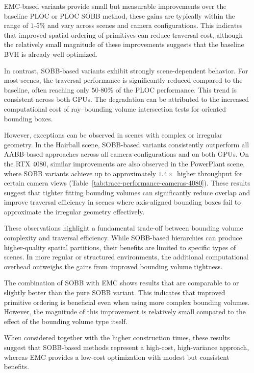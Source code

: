 EMC-based variants provide small but measurable improvements over the baseline PLOC or PLOC SOBB method, these gains are typically within the range of $1\text{-}5\%$ and vary across scenes and camera configurations. This indicates that improved spatial ordering of primitives can reduce traversal cost, although the relatively small magnitude of these improvements suggests that the baseline BVH is already well optimized.

In contrast, SOBB-based variants exhibit strongly scene-dependent behavior. For most scenes, the traversal performance is significantly reduced compared to the baseline, often reaching only $50\text{-}80\%$ of the PLOC performance. This trend is consistent across both GPUs. The degradation can be attributed to the increased computational cost of ray–bounding volume intersection tests for oriented bounding boxes.

However, exceptions can be observed in scenes with complex or irregular geometry. In the Hairball scene, SOBB-based variants consistently outperform all AABB-based approaches across all camera configurations and on both GPUs. On the RTX 4080, similar improvements are also observed in the PowerPlant scene, where SOBB variants achieve up to approximately $1.4\times$ higher throughput for certain camera views (Table~\ref{tab:trace-performance-cameras-4080}). These results suggest that tighter fitting bounding volumes can significantly reduce overlap and improve traversal efficiency in scenes where axis-aligned bounding boxes fail to approximate the irregular geometry effectively.

These observations highlight a fundamental trade-off between bounding volume complexity and traversal efficiency. While SOBB-based hierarchies can produce higher-quality spatial partitions, their benefits are limited to specific types of scenes. In more regular or structured environments, the additional computational overhead outweighs the gains from improved bounding volume tightness.

The combination of SOBB with EMC shows results that are comparable to or slightly better than the pure SOBB variant. This indicates that improved primitive ordering is beneficial even when using more complex bounding volumes. However, the magnitude of this improvement is relatively small compared to the effect of the bounding volume type itself.

When considered together with the higher construction times, these results suggest that SOBB-based methods represent a high-cost, high-variance approach, whereas EMC provides a low-cost optimization with modest but consistent benefits.

